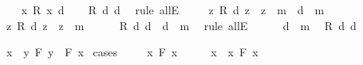 \begin{isabellebody}
%
\isadelimproof
%
\endisadelimproof
%
\isatagproof
{}\isamarkupfalse%
\isanewline
\ \ \isamarkupfalse%
\ {\isachardoublequoteopen}{\isasymforall}\ x{\isachardot}\ R\ x\ d{\isachardoublequoteclose}\isanewline
\ \ \isamarkupfalse%
\ {\isachardoublequoteopen}R\ d\ d{\isachardoublequoteclose}\ \isamarkupfalse%
\ {\isacharparenleft}rule\ allE{\isacharparenright}\isanewline
\ \ \isamarkupfalse%
\ {\isachardoublequoteopen}{\isacharparenleft}{\isasymforall}\ z{\isachardot}\ R\ d\ z\ {\isasymlongrightarrow}\ z\ {\isacharequal}\ m{\isacharparenright}\ {\isasymlongrightarrow}\ d\ {\isacharequal}\ m{\isachardoublequoteclose}\isanewline
\ \ \isamarkupfalse%
\isanewline
\ \ \ \ \isamarkupfalse%
\ {\isachardoublequoteopen}{\isasymforall}\ z{\isachardot}\ R\ d\ z\ {\isasymlongrightarrow}\ z\ {\isacharequal}\ m{\isachardoublequoteclose}\isanewline
\ \ \ \ \isamarkupfalse%
\ {\isachardoublequoteopen}R\ d\ d\ {\isasymlongrightarrow}\ d\ {\isacharequal}\ m{\isachardoublequoteclose}\ \isamarkupfalse%
\ {\isacharparenleft}rule\ allE{\isacharparenright}\isanewline
\ \ \ \ \isamarkupfalse%
\ {\isachardoublequoteopen}d\ {\isacharequal}\ m{\isachardoublequoteclose}\ \isamarkupfalse%
\ {\isacharbackquoteopen}R\ d\ d{\isacharbackquoteclose}\isacommand{{\isachardot}{\isachardot}}\isamarkupfalse%
\isanewline
\ \ \isamarkupfalse%
\isanewline
{}\isamarkupfalse%
%
\endisatagproof
{\isafoldproof}%
%
\isadelimproof
%
\endisadelimproof
%
\begin{isamarkuptext}%
\begin{Answer}[ref = conversedrinker] \end{Answer}%
\end{isamarkuptext}\isamarkuptrue%
\isamarkupfalse%
\ {\isachardoublequoteopen}{\isasymexists}\ x{\isachardot}\ {\isacharparenleft}{\isasymexists}\ y{\isachardot}\ F\ y{\isacharparenright}\ {\isasymlongrightarrow}\ F\ x{\isachardoublequoteclose}\isanewline
%
\isadelimproof
%
\endisadelimproof
%
\isatagproof
{}\isamarkupfalse%
\ cases\isanewline
\ \ \isamarkupfalse%
\ {\isachardoublequoteopen}{\isasymexists}\ x{\isachardot}\ F\ x{\isachardoublequoteclose}\isanewline
\ \ \isamarkupfalse%
\ \isamarkupfalse%
\ x\ \ x{\isacharcolon}\ {\isachardoublequoteopen}F\ x{\isachardoublequoteclose}\isacommand{{\isachardot}{\isachardot}}\isamarkupfalse%

\end{isabellebody}
